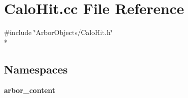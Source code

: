 \section{Calo\+Hit.\+cc File Reference}
\label{CaloHit_8cc}
{\ttfamily \#include \char`\"{}Arbor\+Objects/\+Calo\+Hit.\+h\char`\"{}}\\*
\subsection*{Namespaces}
\begin{DoxyCompactItemize}
\item 
 {\bf arbor\+\_\+content}
\end{DoxyCompactItemize}
